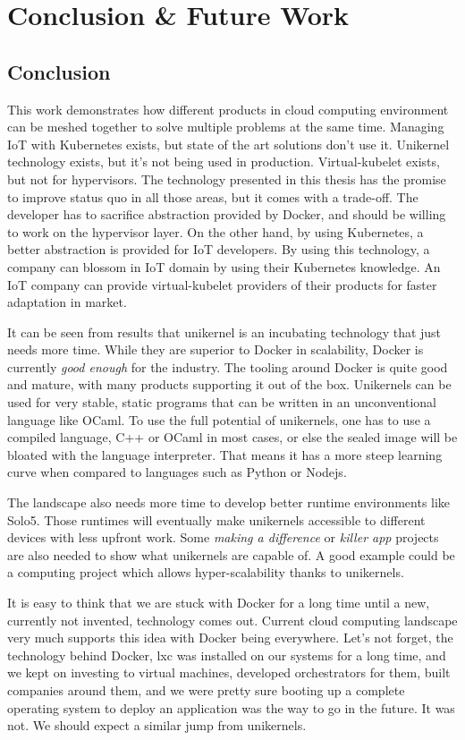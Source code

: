 \chapter{Conclusion \& Future Work}\label{chapter:conclusion}
\section{Conclusion}
This work demonstrates how different products in cloud computing environment can be meshed together to solve multiple problems at the same time. Managing IoT with Kubernetes exists, but state of the art solutions don't use it. Unikernel technology exists, but it's not being used in production. Virtual-kubelet exists, but not for hypervisors. The technology presented in this thesis has the promise to improve status quo in all those areas, but it comes with a trade-off. The developer has to sacrifice abstraction provided by Docker, and should be willing to work on the hypervisor layer. On the other hand, by using Kubernetes, a better abstraction is provided for IoT developers. By using this technology, a company can blossom in IoT domain by using their Kubernetes knowledge. An IoT company can provide virtual-kubelet providers of their products for faster adaptation in market.

It can be seen from results that unikernel is an incubating technology that just needs more time. While they are superior to Docker in scalability, Docker is currently \textit{good enough} for the industry. The tooling around Docker is quite good and mature, with many products supporting it out of the box. Unikernels can be used for very stable, static programs that can be written in an unconventional language like OCaml. To use the full potential of unikernels, one has to use a compiled language, C++ or OCaml in most cases, or else the sealed image will be bloated with the language interpreter. That means it has a more steep learning curve when compared to languages such as Python or Nodejs.

The landscape also needs more time to develop better runtime environments like Solo5. Those runtimes will eventually make unikernels accessible to different devices with less upfront work. Some \textit{making a difference} or \textit{killer app} projects are also needed to show what unikernels are capable of. A good example could be a computing project which allows hyper-scalability thanks to unikernels.

It is easy to think that we are stuck with Docker for a long time until a new, currently not invented, technology comes out. Current cloud computing landscape very much supports this idea with Docker being everywhere. Let's not forget, the technology behind Docker, lxc was installed on our systems for a long time, and we kept on investing to virtual machines, developed orchestrators for them, built companies around them, and we were pretty sure booting up a complete operating system to deploy an application was the way to go in the future. It was not. We should expect a similar jump from unikernels.

